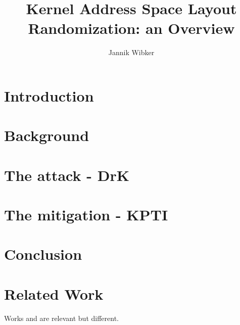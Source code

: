 \documentclass[10pt,twocolumn,a4paper]{article}
\author{Jannik Wibker}
\begin{document}
\title{ Kernel Address Space Layout Randomization: an Overview }

\newcommand{\todo}[1]{{\texttt{[#1]}}}
\newcommand{\code}[1]{{\tt \small{#1}}}

\maketitle

\begin{abstract}

\end{abstract}

\section{Introduction}\label{sec:introduction}



\section{Background}\label{sec:background}



\section{The attack - DrK}\label{sec:drk}



\section{The mitigation - KPTI}\label{sec:kpti}



\section{Conclusion}\label{sec:conclusion}



\section{Related Work}\label{sec:relwork}

Works \cite{xen03virtualization} and \cite{pratt2005xaa} are relevant but
different.



\end{document}
